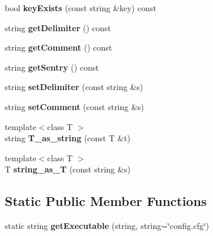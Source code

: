 \begin{DoxyCompactItemize}
\item 
\hypertarget{classConfigFile_afd3d1146ae212a7e5802961f5ad3fe91}{bool {\bfseries key\-Exists} (const string \&key) const }\label{classConfigFile_afd3d1146ae212a7e5802961f5ad3fe91}

\item 
\hypertarget{classConfigFile_adcc1df41c7d669a7cc81c47b85b0ee14}{string {\bfseries get\-Delimiter} () const }\label{classConfigFile_adcc1df41c7d669a7cc81c47b85b0ee14}

\item 
\hypertarget{classConfigFile_a2b0cd50789ea83b1a12bf39293c7401a}{string {\bfseries get\-Comment} () const }\label{classConfigFile_a2b0cd50789ea83b1a12bf39293c7401a}

\item 
\hypertarget{classConfigFile_adf270b0cf2a1b034fc18fd2e82296760}{string {\bfseries get\-Sentry} () const }\label{classConfigFile_adf270b0cf2a1b034fc18fd2e82296760}

\item 
\hypertarget{classConfigFile_af28390aba7d8f399ac734c074e659b99}{string {\bfseries set\-Delimiter} (const string \&s)}\label{classConfigFile_af28390aba7d8f399ac734c074e659b99}

\item 
\hypertarget{classConfigFile_a2e06b3000fb45426c975b334b2cee148}{string {\bfseries set\-Comment} (const string \&s)}\label{classConfigFile_a2e06b3000fb45426c975b334b2cee148}

\item 
\hypertarget{classConfigFile_a9855bff7ed5af9aa408ac06fc7ab4c09}{{\footnotesize template$<$class T $>$ }\\string {\bfseries T\-\_\-as\-\_\-string} (const T \&t)}\label{classConfigFile_a9855bff7ed5af9aa408ac06fc7ab4c09}

\item 
\hypertarget{classConfigFile_a59c6ab56cdfa23a29a38bf3eea1ededf}{{\footnotesize template$<$class T $>$ }\\T {\bfseries string\-\_\-as\-\_\-\-T} (const string \&s)}\label{classConfigFile_a59c6ab56cdfa23a29a38bf3eea1ededf}

\end{DoxyCompactItemize}
\subsection*{Static Public Member Functions}
\begin{DoxyCompactItemize}
\item 
\hypertarget{classConfigFile_a48059336cda29ecbdb5dce2579730df7}{static string {\bfseries get\-Executable} (string, string=\char`\"{}config.\-cfg\char`\"{})}\label{classConfigFile_a48059336cda29ecbdb5dce2579730df7}

\end{DoxyCompactItemize}
